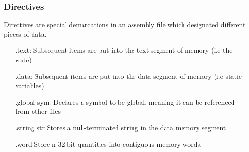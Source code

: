 \documentclass{article}
\begin{document}
\subsubsection{Directives}
Directives are special demarcations in an assembly file which designated different pieces of data.
\begin{itemize}
    \item[.text:] Subsequent items are put into the text segment of memory (i.e the code)
    \item[.data:] Subsequent items are put into the data segment of memory (i.e static variables)
    \item[.global sym:] Declares a symbol to be global, meaning it can be referenced from other files
    \item[.string str] Stores a null-terminated string in the data memory segment
    \item[.word] Store n 32 bit quantities into contiguous memory words.
\end{itemize}
\end{document}
